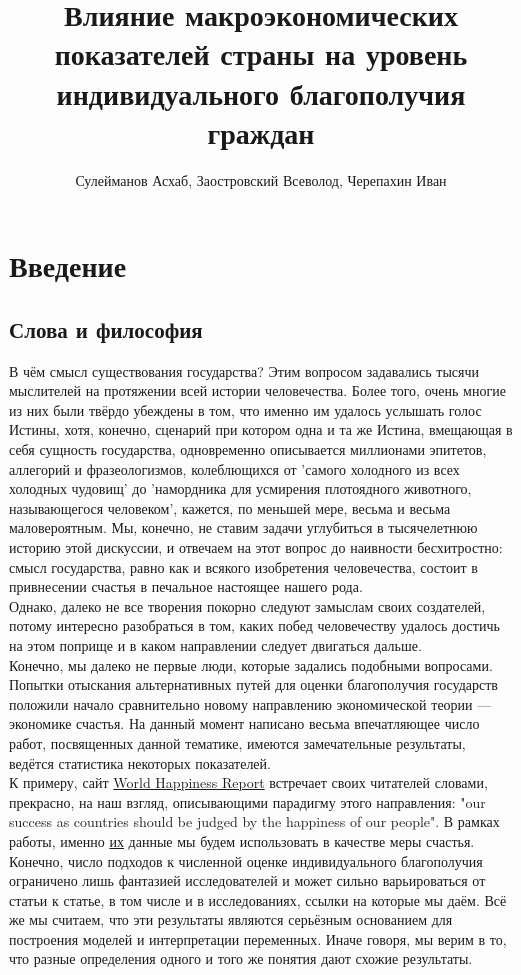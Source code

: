 \documentclass[russian]{vegareport}
\title{Влияние макроэкономических показателей страны на уровень индивидуального благополучия граждан}
\author{Сулейманов Асхаб, Заостровский Всеволод, Черепахин Иван}
\date{}
\begin{document}
    \maketitle

    \chapter{Введение}
        \section{Слова и философия}
        В чём смысл существования государства? Этим вопросом задавались тысячи мыслителей на протяжении всей истории человечества. 
        Более того, очень многие из них были твёрдо убеждены в том, что именно им удалось услышать голос Истины, 
        хотя, конечно, сценарий при котором одна и та же Истина, вмещающая в себя сущность государства, 
        одновременно описывается миллионами эпитетов, аллегорий и фразеологизмов, колеблющихся от 
        'самого холодного из всех холодных чудовищ' до 'намордника для усмирения плотоядного животного, называющегося человеком', 
        кажется, по меньшей мере, весьма и весьма маловероятным. Мы, конечно, не ставим задачи углубиться 
        в тысячелетнюю историю этой дискуссии, и отвечаем на этот вопрос до наивности бесхитростно: смысл государства, 
        равно как и всякого изобретения человечества, состоит в привнесении счастья в печальное настоящее нашего рода.
        \\
        Однако, далеко не все творения покорно следуют замыслам своих создателей, потому интересно разобраться в том, 
        каких побед человечеству удалось достичь на этом поприще и в каком направлении следует двигаться дальше.
        \\
        Конечно, мы далеко не первые люди, которые задались подобными вопросами. 
        Попытки отыскания альтернативных путей для оценки благополучия государств 
        положили начало сравнительно новому направлению экономической теории --- экономике счастья. 
        На данный момент написано весьма впечатляющее число работ, посвященных данной тематике, 
        имеются замечательные результаты, ведётся статистика некоторых показателей.
        \\
        К примеру, сайт \href{https://worldhappiness.report/}{World Happiness Report} 
        встречает своих читателей словами, прекрасно, на наш взгляд, описывающими 
        парадигму этого направления: "our success as countries should be judged by the happiness of our people". В рамках работы, именно \href{https://www.kaggle.com/datasets/mathurinache/world-happiness-report-20152021?select=2016.csv}{их} данные мы будем использовать в качестве меры счастья. Конечно, число подходов к численной оценке индивидуального благополучия ограничено лишь фантазией исследователей и может сильно варьироваться от статьи к статье, в том числе и в исследованиях, ссылки на которые мы даём. Всё же мы считаем, что эти результаты являются серьёзным основанием для построения моделей и интерпретации переменных. Иначе говоря, мы верим в то, что разные определения одного и того же понятия дают схожие результаты.
\end{document}
